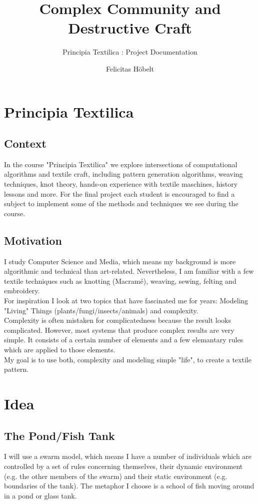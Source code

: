 \documentclass{scrartcl}
\title{Complex Community and Destructive Craft}
\subtitle{Principia Textilica : Project Documentation}
\author{Felicitas Höbelt}
\begin{document}
\maketitle

\section{Principia Textilica}

\subsection{Context}
In the course "Principia Textilica" we explore intersections of computational algorithms and textile craft, including pattern generation algorithms, weaving techniques, knot theory, hands-on experience with textile maschines, history lessons and more.
For the final project each student is encouraged to find a subject to implement some of the methods and techniques we see during the course.

\subsection{Motivation}

I study Computer Science and Media, which means my background is more algorithmic and technical than art-related.
Nevertheless, I am familiar with a few textile techniques such as knotting (Macramé), weaving, sewing, felting and embroidery.\\
For inspiration I look at two topics that have fascinated me for years: Modeling "Living" Things (plants/fungi/insects/animals) and complexity.\\
Complexity is often mistaken for complicatedness because the result looks complicated.
However, most systems that produce complex results are very simple. It consists of a certain number of elements and a few elemantary rules which are applied to those elements.\\
My goal is to use both, complexity and modeling simple "life", to create a textile pattern.

\section{Idea}

\subsection{The Pond/Fish Tank}
I will use a swarm model, which means I have a number of individuals which are controlled by a set of rules concerning themselves, their dynamic environment (e.g. the other members of the swarm) and their static environment (e.g. boundaries of the tank).
The metaphor I choose is a school of fish moving around in a pond or glass tank.
\end{document}
